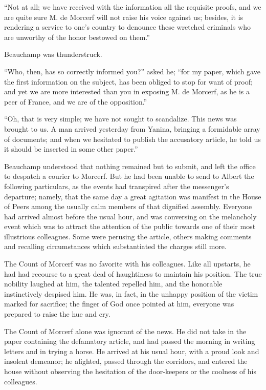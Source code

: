 “Not at all; we have received with the information all the requisite
proofs, and we are quite sure M. de Morcerf will not raise his voice
against us; besides, it is rendering a service to one’s country to
denounce these wretched criminals who are unworthy of the honor
bestowed on them.”

Beauchamp was thunderstruck.

“Who, then, has so correctly informed you?” asked he; “for my paper,
which gave the first information on the subject, has been obliged to
stop for want of proof; and yet we are more interested than you in
exposing M. de Morcerf, as he is a peer of France, and we are of the
opposition.”

“Oh, that is very simple; we have not sought to scandalize. This news
was brought to us. A man arrived yesterday from Yanina, bringing a
formidable array of documents; and when we hesitated to publish the
accusatory article, he told us it should be inserted in some other
paper.”

Beauchamp understood that nothing remained but to submit, and left the
office to despatch a courier to Morcerf. But he had been unable to send
to Albert the following particulars, as the events had transpired after
the messenger’s departure; namely, that the same day a great agitation
was manifest in the House of Peers among the usually calm members of
that dignified assembly. Everyone had arrived almost before the usual
hour, and was conversing on the melancholy event which was to attract
the attention of the public towards one of their most illustrious
colleagues. Some were perusing the article, others making comments and
recalling circumstances which substantiated the charges still more.

The Count of Morcerf was no favorite with his colleagues. Like all
upstarts, he had had recourse to a great deal of haughtiness to
maintain his position. The true nobility laughed at him, the talented
repelled him, and the honorable instinctively despised him. He was, in
fact, in the unhappy position of the victim marked for sacrifice; the
finger of God once pointed at him, everyone was prepared to raise the
hue and cry.

The Count of Morcerf alone was ignorant of the news. He did not take in
the paper containing the defamatory article, and had passed the morning
in writing letters and in trying a horse. He arrived at his usual hour,
with a proud look and insolent demeanor; he alighted, passed through
the corridors, and entered the house without observing the hesitation
of the door-keepers or the coolness of his colleagues.

